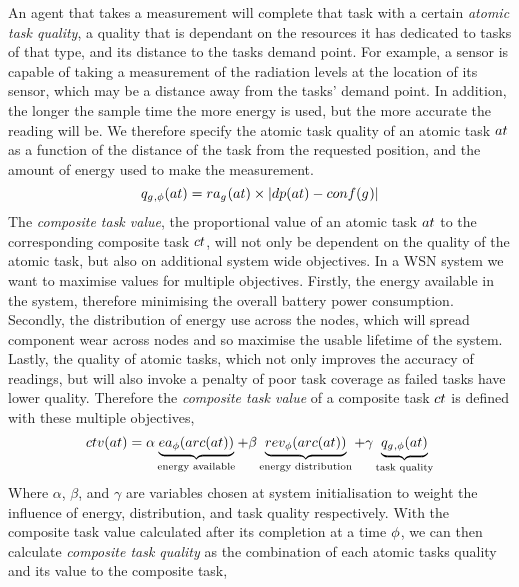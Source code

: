 An agent that takes a measurement will complete that task with a certain \textit{atomic task quality}, a quality that is dependant on the resources it has dedicated to tasks of that type, and its distance to the tasks demand point. For example, a sensor is capable of taking a measurement of the radiation levels at the location of its sensor, which may be a distance away from the tasks' demand point. In addition, the longer the sample time the more energy is used, but the more accurate the reading will be. We therefore specify the atomic task quality of an atomic task $\varAtomicTask{}{}$ as a function of the distance of the task from the requested position, and the amount of energy used to make the measurement.
\begin{equation}
\label{eq:atomic_task_quality}
	\functionAtomicTaskQualitySignature{}{} = \functionTaskResourceAllocation{}{} \times \funcSize{
			\functionTaskDemandPoint{}{} - \functionDeployment{\varAgent{}{}}{}
	}{}
\end{equation}
The \textit{composite task value}, the proportional value of an atomic task $\varAtomicTask{}{}$ to the corresponding composite task $\varCompositeTask{}{}$, will not only be dependent on the quality of the atomic task, but also on additional system wide objectives. In a WSN system we want to maximise values for multiple objectives. Firstly, the energy available in the system, therefore minimising the overall battery power consumption. Secondly, the distribution of energy use across the nodes, which will spread component wear across nodes and so maximise the usable lifetime of the system. Lastly, the quality of atomic tasks, which not only improves the accuracy of readings, but will also invoke a penalty of poor task coverage as failed tasks have lower quality. Therefore the \textit{composite task value} of a composite task $\varCompositeTask{}{}$ is defined with these multiple objectives,
\begin{equation}
	\label{eq:ctv}
	\functionCompositeTaskValue{}{} = 
	\alpha\underbrace{\functionEnergyAvailable{\functionTaskArc{}{}}{}}_{\text{energy available}}
	+ \beta\underbrace{\functionEnergyVariability{\functionTaskArc{}{}}{}}_{\text{energy distribution}}
	+ 
	\gamma\underbrace{\functionAtomicTaskQualitySignature{}{}}_{\text{task quality}}
\end{equation}
Where $\alpha$, $\beta$, and $\gamma$ are variables chosen at system initialisation to weight the influence of energy, distribution, and task quality respectively. With the composite task value calculated after its completion  at a time $\phi$, we can then calculate \textit{composite task quality} as the combination of each atomic tasks quality and its value to the composite task,
